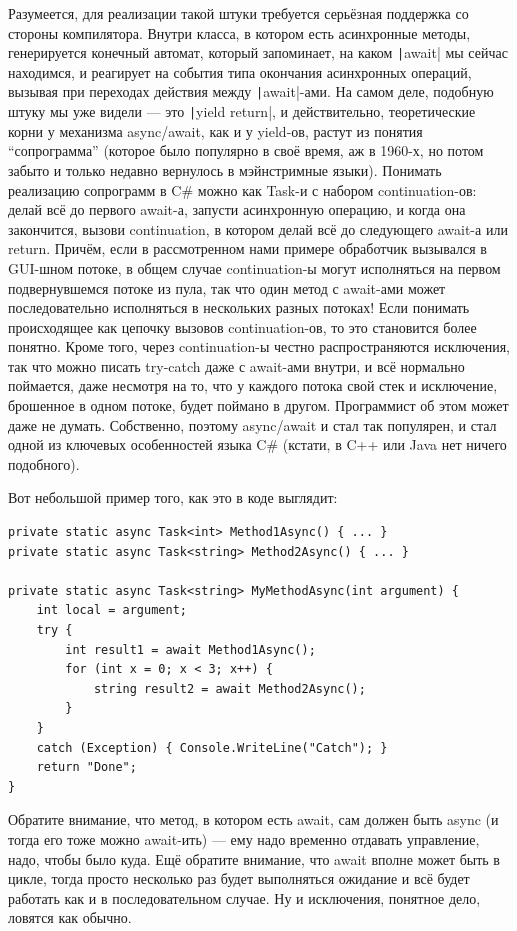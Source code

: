 \documentclass[a5paper]{article}
\begin{document}
Разумеется, для реализации такой штуки требуется серьёзная поддержка со стороны компилятора. Внутри класса, в котором есть асинхронные методы, генерируется конечный автомат, который запоминает, на каком \texttt|await| мы сейчас находимся, и реагирует на события типа окончания асинхронных операций, вызывая при переходах действия между \texttt|await|-ами. На самом деле, подобную штуку мы уже видели --- это \texttt|yield return|, и действительно, теоретические корни у механизма async/await, как и у yield-ов, растут из понятия ``сопрограмма'' (которое было популярно в своё время, аж в 1960-х, но потом забыто и только недавно вернулось в мэйнстримные языки). Понимать реализацию сопрограмм в C\# можно как Task-и с набором continuation-ов: делай всё до первого await-а, запусти асинхронную операцию, и когда она закончится, вызови continuation, в котором делай всё до следующего await-а или return. Причём, если в рассмотренном нами примере обработчик вызывался в GUI-шном потоке, в общем случае continuation-ы могут исполняться на первом подвернувшемся потоке из пула, так что один метод с await-ами может последовательно исполняться в нескольких разных потоках! Если понимать происходящее как цепочку вызовов continuation-ов, то это становится более понятно. Кроме того, через continuation-ы честно распространяются исключения, так что можно писать try-catch даже с await-ами внутри, и всё нормально поймается, даже несмотря на то, что у каждого потока свой стек и исключение, брошенное в одном потоке, будет поймано в другом. Программист об этом может даже не думать. Собственно, поэтому async/await и стал так популярен, и стал одной из ключевых особенностей языка C\# (кстати, в C++ или Java нет ничего подобного).

Вот небольшой пример того, как это в коде выглядит:

\begin{verbatim}
private static async Task<int> Method1Async() { ... }
private static async Task<string> Method2Async() { ... }

private static async Task<string> MyMethodAsync(int argument) {
    int local = argument;
    try {
        int result1 = await Method1Async();
        for (int x = 0; x < 3; x++) {
            string result2 = await Method2Async();
        }
    }
    catch (Exception) { Console.WriteLine("Catch"); }
    return "Done";
}
\end{verbatim}

Обратите внимание, что метод, в котором есть await, сам должен быть async (и тогда его тоже можно await-ить) --- ему надо временно отдавать управление, надо, чтобы было куда. Ещё обратите внимание, что await вполне может быть в цикле, тогда просто несколько раз будет выполняться ожидание и всё будет работать как и в последовательном случае. Ну и исключения, понятное дело, ловятся как обычно.
\end{document}
